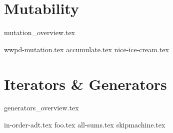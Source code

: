 \documentclass{exam}
\begin{document}
\section{Mutability}
	{mutation_overview.tex}
	\begin{questions}
	    {wwpd-mutation.tex}
        {accumulate.tex}
        {nice-ice-cream.tex}
	\end{questions}

\newpage
\section{Iterators \& Generators}
{generators_overview.tex}
\begin{questions}
    {in-order-adt.tex}
    {foo.tex}
    {all-sums.tex}
    {skipmachine.tex}
\end{questions}
\end{document}
